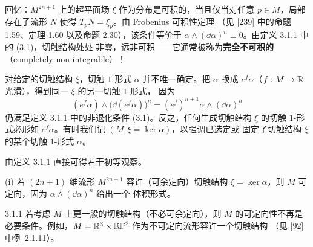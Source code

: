 

回忆：$M^{2n+1}$ 上的超平面场 $\xi$ 作为分布是可积的，当且仅当对任意
$p\in M$，局部存在子流形 $N$ 使得 $T_pN=\xi_p$。由 Frobenius 可积性定理
（见 [239] 中的命题 1.59、定理 1.60 以及命题 2.30），该条件等价于
$\alpha\wedge(\dd\alpha)^n\equiv 0$。由定义 3.1.1 中的 (3.1)，切触结构处处
非零，远非可积——它通常被称为\textbf{完全不可积的}
（completely non-integrable）！


对给定的切触结构 $\xi$，切触 $1$-形式 $\alpha$ 并不唯一确定。把 $\alpha$
换成 $e^f\alpha$（$f:M\to\mathbb{R}$ 光滑），得到同一 $\xi$ 的另一切触 $1$-形式，
因为
\[
  (e^f\alpha)\wedge\bigl(\dd(e^f\alpha)\bigr)^n
  =(e^f)^{n+1}\alpha\wedge(\dd\alpha)^n
\]
仍满足定义 3.1.1 中的非退化条件 (3.1)。反之，任何生成切触结构 $\xi$ 的切触
$1$-形式必形如 $e^f\alpha$。有时我们记 $(M,\xi=\ker\alpha)$，以强调已选定或
固定了切触结构 $\xi$ 的某个切触 $1$-形式 $\alpha$。

由定义 3.1.1 直接可得若干初等观察。

(i) 若 $(2n+1)$ 维流形 $M^{2n+1}$ 容许（可余定向）切触结构
$\xi=\ker\alpha$，则 $M$ 可定向，因为 $\alpha\wedge(\dd\alpha)^n$ 给出一个
体积形式。

\begin{wrem}{3.1.1}
若考虑 $M$ 上更一般的切触结构（不必可余定向），则 $M$ 的可定向性不再是
必要条件。例如，$M=\mathbb{R}^3\times\mathbb{RP}^2$ 作为不可定向流形容许一个切触结构
（见 [92] 中例 2.1.11）。
\end{wrem}

